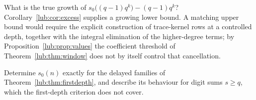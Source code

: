 \begin{question}\label{lub:q:growth}
What is the true growth of $s_0\bigl((q-1)q^k\bigr)-(q-1)q^k$? Corollary~\ref{lub:cor:excess}
supplies a growing lower bound. A matching upper bound would require the explicit
construction of trace-kernel rows at a controlled depth, together with the integral
elimination of the higher-degree terms; by Proposition~\ref{lub:prop:values} the coefficient threshold
of Theorem~\ref{lub:thm:window} does not by itself control that cancellation.
\end{question}

\begin{question}\label{lub:q:delayed}
Determine $s_0(n)$ exactly for the delayed families of Theorem~\ref{lub:thm:firstdepth}, and
describe its behaviour for digit sums $s\ge q$, which the first-depth criterion does not
cover.
\end{question}
